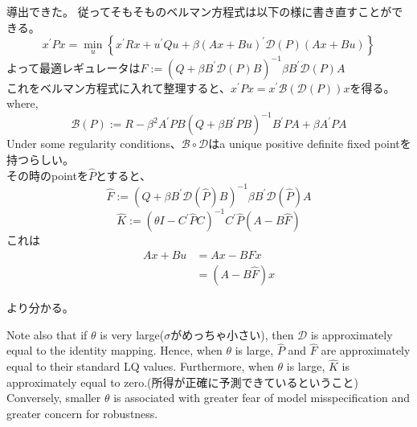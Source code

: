 \documentclass[a4paper,10pt,dvipdfmx]{jarticle}
\begin{document}
導出できた。
従ってそもそものベルマン方程式は以下の様に書き直すことができる。
\begin{equation}
    x^{\prime} P x=\min _u\left\{x^{\prime} R x+u^{\prime} Q u+\beta(A x+B u)^{\prime} \mathcal{D}(P)(A x+B u)\right\}
    \end{equation}
よって最適レギュレータは$F:=\left(Q+\beta B^{\prime} \mathcal{D}(P) B\right)^{-1} \beta B^{\prime} \mathcal{D}(P) A$
\\ これをベルマン方程式に入れて整理すると、$x^{\prime} P x=x^{\prime} \mathcal{B}(\mathcal{D}(P)) x$を得る。
where,\begin{equation}
    \mathcal{B}(P):=R-\beta^2 A^{\prime} P B\left(Q+\beta B^{\prime} P B\right)^{-1} B^{\prime} P A+\beta A^{\prime} P A
    \end{equation}
    Under some regularity conditions、$\mathcal{B} \circ \mathcal{D}$はa unique positive definite fixed pointを持つらしい。\\
    その時のpointを$\hat{P}$とすると、
    \begin{equation}
        \hat{F}:=\left(Q+\beta B^{\prime} \mathcal{D}(\hat{P}) B\right)^{-1} \beta B^{\prime} \mathcal{D}(\hat{P}) A
        \end{equation}
        \begin{equation}
            \hat{K}:=\left(\theta I-C^{\prime} \hat{P} C\right)^{-1} C^{\prime} \hat{P}(A-B \hat{F})
            \end{equation}
            これは
\begin{align}
    Ax+Bu&=Ax-BFx \\
    &=(A-B\hat{F})x
\end{align}

より分かる。


Note also that if $\theta$ is very large($\sigma$がめっちゃ小さい), then $\mathcal{D}$ is approximately equal to the identity mapping.
Hence, when $\theta$ is large, $\hat{P}$ and $\hat{F}$ are approximately equal to their standard LQ values.
Furthermore, when $\theta$ is large, $\hat{K}$ is approximately equal to zero.(所得が正確に予測できているということ)
Conversely, smaller $\theta$ is associated with greater fear of model misspecification and greater concern for robustness.
\end{document}
